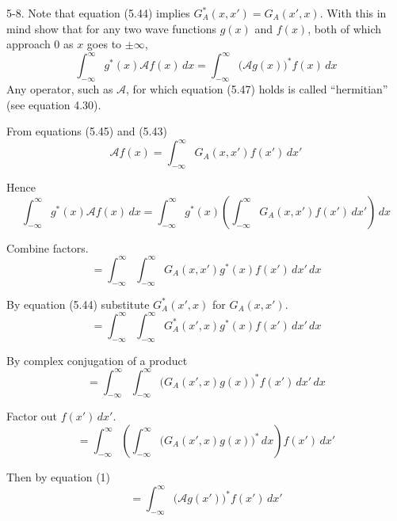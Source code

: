 \documentclass[12pt]{article}
\begin{document}
5-8.
Note that equation (5.44) implies $G_A^*(x,x')=G_A(x',x)$.
With this in mind show that for any two wave functions
$g(x)$ and $f(x)$, both of which approach 0 as $x$ goes to $\pm\infty$,
\begin{equation*}
\int_{-\infty}^\infty
g^*(x)\mathcal Af(x)\,dx=
\int_{-\infty}^\infty
\big(\mathcal Ag(x)\big)^*f(x)\,dx
\tag{5.47}
\end{equation*}
Any operator, such as $\mathcal A$, for which equation (5.47)
holds is called ``hermitian'' (see equation 4.30).

\bigskip
From equations (5.45) and (5.43)
\begin{equation*}
\mathcal Af(x)=\int_{-\infty}^\infty G_A(x,x')f(x')\,dx'
\tag{1}
\end{equation*}

Hence
\begin{equation*}
\int_{-\infty}^\infty g^*(x)\mathcal Af(x)\,dx
=\int_{-\infty}^\infty g^*(x)
\left(\int_{-\infty}^\infty G_A(x,x')f(x')\,dx'\right)
\,dx
\end{equation*}

Combine factors.
\begin{equation*}
{}=\int_{-\infty}^\infty
\int_{-\infty}^\infty G_A(x,x')g^*(x)f(x')\,dx'
\,dx
\end{equation*}

By equation (5.44) substitute $G_A^*(x',x)$ for $G_A(x,x')$.
\begin{equation*}
{}=\int_{-\infty}^\infty
\int_{-\infty}^\infty G_A^*(x',x)g^*(x)f(x')\,dx'
\,dx
\end{equation*}

By complex conjugation of a product
\begin{equation*}
{}=\int_{-\infty}^\infty
\int_{-\infty}^\infty\big(G_A(x',x)g(x)\big)^*f(x')\,dx'
\,dx
\end{equation*}

Factor out $f(x')\,dx'$.
\begin{equation*}
{}=\int_{-\infty}^\infty
\left(\int_{-\infty}^\infty\big(G_A(x',x)g(x)\big)^*\,dx\right)f(x')\,dx'
\end{equation*}

Then by equation (1)
\begin{equation*}
{}=\int_{-\infty}^\infty\big(\mathcal Ag(x')\big)^*f(x')\,dx'
\end{equation*}
\end{document}
